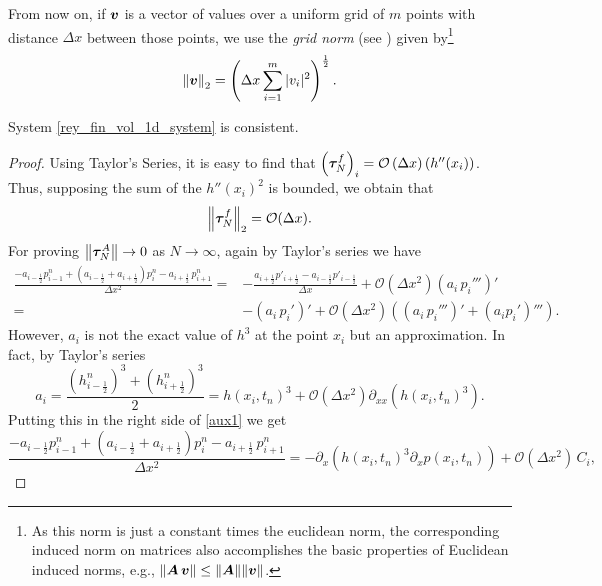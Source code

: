 From now on, if $\boldsymbol{v}$ is a vector of values over a uniform grid of $m$ points with distance $\Delta x$ between those points, we use the \emph{grid norm} (see \cite{leveque2007}) given by\footnote{As this norm is just a constant times the euclidean norm, the corresponding induced norm on matrices also accomplishes the basic properties of Euclidean induced norms, e.g., $\|\boldsymbol{A}\,\boldsymbol{v}\|\leq \|\boldsymbol{A}\|\|\boldsymbol{v}\|$.}
\begin{equation*}
\left\Vert \boldsymbol{v}\right\Vert_2 =\left( \Delta x \sum_{i=1}^m |v_i|^2 \right)^\frac{1}{2}.
\end{equation*}
\begin{proposition}\label{prop:reynolds_scheme_consistency}
System \eqref*{rey_fin_vol_1d_system} is consistent.
\begin{proof}
Using Taylor's Series, it is easy to find that 
$\left(\boldsymbol{\tau}_N^f\right)_i = \mathcal{O}\left(\Delta x\right)\left( h''(x_i)\right)$. Thus, supposing the sum of the $h''(x_i)^2$ is bounded, we obtain that
\begin{equation}
\left\lVert \bds{\tau}^f_N \right\rVert_2 =\mathcal{O}(\Delta x) .\label{eq:tau_f_trunc_order}
\end{equation}
For proving $\left\lVert\boldsymbol{\tau}_N^A\right\rVert\rightarrow 0$ as $N\rightarrow \infty$, again by Taylor's series we have
\begin{align}
\frac{-a_{i-\frac{1}{2}} p_{i-1}^n
+\left(a_{i-\frac{1}{2}}+a_{i+\frac{1}{2}}\right)p_i^n
-a_{i+\frac{1}{2}}\, p_{i+1}^n}{\Delta x^2}={}&-\frac{a_{i+\frac{1}{2}}p'_{i+\frac{1}{2}}-a_{i-\frac{1}{2}}p'_{i-\frac{1}{2}}}{\Delta x}+\mathcal{O}(\Delta x^2)\left(a_i\,p_i'''\right)'\nonumber\\
={}&-\left(a_i\,p_i'\right)'+\mathcal{O}\left(\Delta x^2\right)\left(\left(a_i\,p_i'''\right)'+\left(a_ip_i'\right)'''\right)\label{eq:aux1}.
\end{align}
However, $a_{i}$ is not the exact value of $h^3$ at the point $x_{i}$ but an approximation. In fact, by Taylor's series
\begin{equation*}
a_{i}=\frac{\left(h_{i-\frac{1}{2}}^n\right)^3+\left(h_{i+\frac{1}{2}}^n\right)^3}{2}=h\left(x_{i},t_n\right)^3+\mathcal{O}\left(\Delta x^2\right)\partial_{xx}\left(h\left(x_{i},t_n\right)^3\right).
\end{equation*}
Putting this in the right side of \eqref{aux1} we get
\begin{equation*}
\frac{-a_{i-\frac{1}{2}} p_{i-1}^n
+\left(a_{i-\frac{1}{2}}+a_{i+\frac{1}{2}}\right)p_i^n
-a_{i+\frac{1}{2}}\, p_{i+1}^n}{\Delta x^2}=-\partial_x\left(h\left(x_{i},t_n\right)^3\partial_x p\left(x_{i},t_n\right)\right)+\mathcal{O}(\Delta x^2)\,C_i,

\end{equation*}
\end{proof}
\end{proposition}
